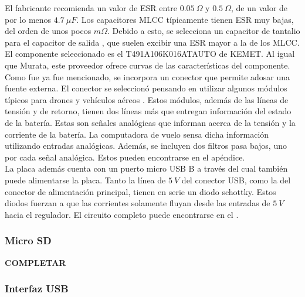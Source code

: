 El fabricante recomienda un valor de ESR entre $0.05 \ \Omega$ y $0.5 \  \Omega$, de un valor de por lo menos $4.7 \ \mu F$. Los capacitores MLCC típicamente tienen ESR muy bajas, del orden de unos pocos $m \Omega$. Debido a esto, se selecciona un capacitor de tantalio para el capacitor de salida \cite{AN1482}, que suelen excibir una ESR mayor a la de los MLCC. El componente seleccionado es el T491A106K016ATAUTO de KEMET. Al igual que Murata, este proveedor ofrece curvas de las características del componente.\\

Como fue ya fue mencionado, se incorpora un conector que permite adosar una fuente externa. El conector se seleccionó pensando en utilizar algunos módulos típicos para drones y vehículos aéreos \cite{HolybroPM02PowerModule}. Estos módulos, además de las líneas de tensión y de retorno, tienen dos líneas más que entregan información del estado de la batería. Estas son señales analógicas que informan acerca de la tensión y la corriente de la batería. La computadora de vuelo sensa dicha información utilizando entradas analógicas. Además, se incluyen dos filtros pasa bajos, uno por cada señal analógica. Estos pueden encontrarse en el apéndice.\\

La placa además cuenta con un puerto micro USB B a través del cual también puede alimentarse la placa. Tanto la línea de $5 \ V$ del conector USB, como la del conector de alimentación principal, tienen en serie un diodo schottky. Estos diodos fuerzan a que las corrientes solamente fluyan desde las entradas de $5 \ V$ hacia el regulador. El circuito completo puede encontrarse en el .\\

\subsubsection{Micro SD}

\textbf{{\color{red} COMPLETAR}}

\subsubsection{Interfaz USB}

